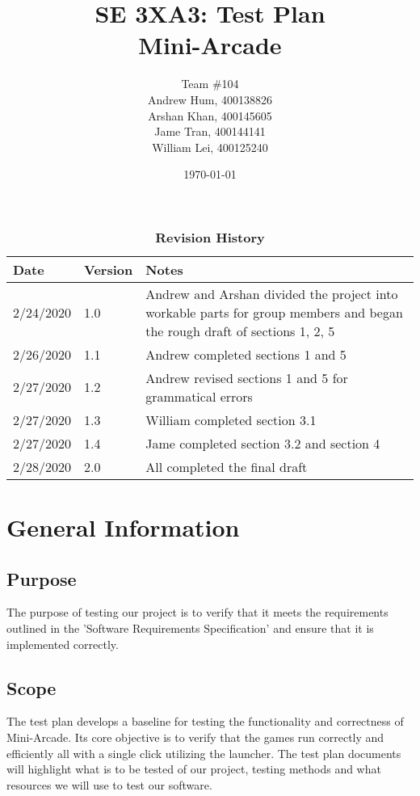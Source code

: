\documentclass[12pt, titlepage]{article}
\title{SE 3XA3: Test Plan\\Mini-Arcade}
\author{Team \#104
		\\ Andrew Hum, 400138826
		\\ Arshan Khan, 400145605
		\\ Jame Tran, 400144141
		\\ William Lei, 400125240
}
\date{\today}
\begin{document}
\maketitle

\tableofcontents
\listoftables
\listoffigures

\begin{table}[hbp]
\caption{\bf Revision History}
\begin{tabularx}{\textwidth}{p{3cm}p{2cm}X}
\toprule {\bf Date} & {\bf Version} & {\bf Notes}\\
\midrule
2/24/2020 & 1.0 & Andrew and Arshan divided the project into workable parts for group members and began the rough draft of sections 1, 2, 5\\
2/26/2020 & 1.1 & Andrew completed sections 1 and 5\\
2/27/2020 & 1.2 & Andrew revised sections 1 and 5 for grammatical errors\\
2/27/2020 & 1.3 & William completed section 3.1\\
2/27/2020 & 1.4 & Jame completed section 3.2 and section 4\\
2/28/2020 & 2.0 & All completed the final draft\\
\bottomrule
\end{tabularx}
\end{table}

\newpage


\section{General Information}

\subsection{Purpose}

The purpose of testing our project is to verify that it meets the requirements outlined in the 'Software Requirements Specification' and ensure that it is implemented correctly.

\subsection{Scope}

The test plan develops a baseline for testing the functionality and correctness of Mini-Arcade. Its core objective is to verify that the games run correctly and efficiently all with a single click utilizing the launcher. The test plan documents will highlight what is to be tested of our project, testing methods and what resources we will use to test our software.
\end{document}
